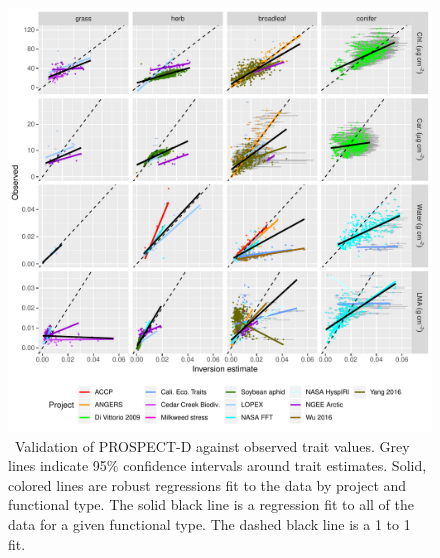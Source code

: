 \begin{figure}
  \centering
  \includegraphics[width=\textwidth]{figures/validation_by_gf.pdf}
  \caption{\
    Validation of PROSPECT-D against observed trait values.
    Grey lines indicate 95\% confidence intervals around trait estimates.
    Solid, colored lines are robust regressions fit to the data by project and functional type.
    The solid black line is a regression fit to all of the data for a given functional type.
    The dashed black line is a 1 to 1 fit.
  }\label{fig:prospect_D_validation}
\end{figure}

